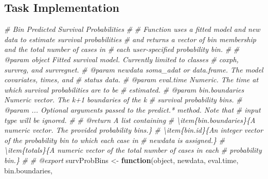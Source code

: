 \documentclass[
]{book}
\newenvironment{Shaded}{\begin{snugshade}}{\end{snugshade}}
\newcommand{\CommentTok}[1]{\textcolor[rgb]{0.56,0.35,0.01}{\textit{#1}}}
\newcommand{\ControlFlowTok}[1]{\textcolor[rgb]{0.13,0.29,0.53}{\textbf{#1}}}
\newcommand{\NormalTok}[1]{#1}
\newcommand{\OtherTok}[1]{\textcolor[rgb]{0.56,0.35,0.01}{#1}}
\begin{document}
\hypertarget{task-implementation-2}{%
\subsection{Task Implementation}\label{task-implementation-2}}

\begin{Shaded}
\begin{Highlighting}[]
\CommentTok{\#\textquotesingle{} Bin Predicted Survival Probabilities}
\CommentTok{\#\textquotesingle{} }
\CommentTok{\#\textquotesingle{} Function uses a fitted model and new data to estimate survival probabilities}
\CommentTok{\#\textquotesingle{}   and returns a vector of bin membership and the total number of cases in}
\CommentTok{\#\textquotesingle{}   each user{-}specified probability bin.}
\CommentTok{\#\textquotesingle{}   }
\CommentTok{\#\textquotesingle{} @param object Fitted survival model. Currently limited to classes}
\CommentTok{\#\textquotesingle{}   \textasciigrave{}coxph\textasciigrave{}, \textasciigrave{}survreg\textasciigrave{}, and \textasciigrave{}survregnet\textasciigrave{}.}
\CommentTok{\#\textquotesingle{} @param newdata soma\_adat or data.frame. The model covariates, times, and}
\CommentTok{\#\textquotesingle{}   status data.}
\CommentTok{\#\textquotesingle{} @param eval.time Numeric. The time at which survival probabilities are to be}
\CommentTok{\#\textquotesingle{}   estimated.}
\CommentTok{\#\textquotesingle{} @param bin.boundaries Numeric vector. The k+1 boundaries of the k}
\CommentTok{\#\textquotesingle{}   survival probability bins.}
\CommentTok{\#\textquotesingle{} @param ... Optional arguments passed to the \textasciigrave{}predict.*\textasciigrave{} method. Note that}
\CommentTok{\#\textquotesingle{}   input \textasciigrave{}type\textasciigrave{} will be ignored.}
\CommentTok{\#\textquotesingle{} }
\CommentTok{\#\textquotesingle{} @return A list containing}
\CommentTok{\#\textquotesingle{} \textbackslash{}item\{bin.boundaries\}\{A numeric vector. The provided probability bins.\}}
\CommentTok{\#\textquotesingle{} \textbackslash{}item\{bin.id\}\{An integer vector of the probability bin to which each case in }
\CommentTok{\#\textquotesingle{}   \textasciigrave{}newdata\textasciigrave{} is assigned.\}}
\CommentTok{\#\textquotesingle{} \textbackslash{}item\{totals\}\{A numeric vector of the total number of cases in each }
\CommentTok{\#\textquotesingle{}   probability bin.\}}
\CommentTok{\#\textquotesingle{} }
\CommentTok{\#\textquotesingle{} @export}
\NormalTok{survProbBins }\OtherTok{\textless{}{-}} \ControlFlowTok{function}\NormalTok{(object, newdata, eval.time, bin.boundaries, }

\end{Highlighting}
\end{Shaded}
\end{document}
